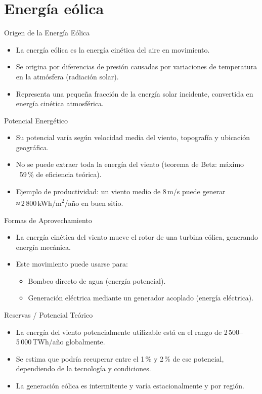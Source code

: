 \documentclass[main.tex]{subfiles}
\begin{document}
\section{Energía eólica}
\begin{frame}{Origen de la Energía Eólica}
    \begin{itemize}
        \item La energía eólica es la energía cinética del aire en movimiento.
        \item Se origina por diferencias de presión causadas por variaciones de temperatura en la atmósfera (radiación solar).
        \item Representa una pequeña fracción de la energía solar incidente, convertida en energía cinética atmosférica.
    \end{itemize}
\end{frame}


\begin{frame}{Potencial Energético}
    \begin{itemize}
        \item Su potencial varía según velocidad media del viento, topografía y ubicación geográfica.
        \item No se puede extraer toda la energía del viento (teorema de Betz: máximo ~59 \% de eficiencia teórica).
        \item Ejemplo de productividad: un viento medio de 8 m/s puede generar ≈ 2 800 kWh/m\textsuperscript{2}/año en buen sitio.
    \end{itemize}
\end{frame}


\begin{frame}{Formas de Aprovechamiento}
    \begin{itemize}
        \item La energía cinética del viento mueve el rotor de una turbina eólica, generando energía mecánica.
        \item Este movimiento puede usarse para:
        \begin{itemize}
            \item Bombeo directo de agua (energía potencial).
            \item Generación eléctrica mediante un generador acoplado (energía eléctrica).
        \end{itemize}
    \end{itemize}
\end{frame}


\begin{frame}{Reservas / Potencial Teórico}
    \begin{itemize}
        \item La energía del viento potencialmente utilizable está en el rango de 2 500–5 000 TWh/año globalmente.
        \item Se estima que podría recuperar entre el 1 \% y 2 \% de ese potencial, dependiendo de la tecnología y condiciones.
        \item La generación eólica es intermitente y varía estacionalmente y por región.
    \end{itemize}
\end{frame}
\end{document}
